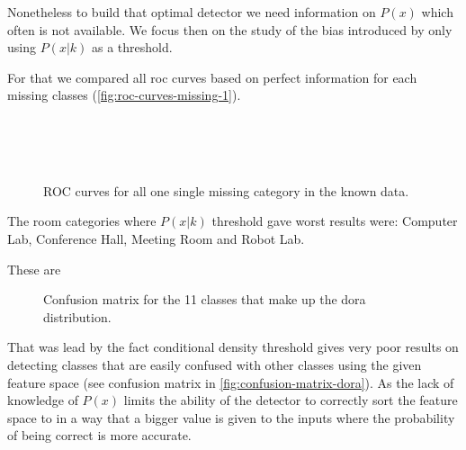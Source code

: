 \documentclass[a4paper]{article}
\begin{document}
Nonetheless to build that optimal detector we need information on $P(x)$ which often is not available.
We focus then on the study of the bias introduced by only using $P(x|k)$ as a threshold.

For that we compared all roc curves based on perfect information for each missing
classes (\autoref{fig:roc-curves-missing-1}).

\begin{figure}[h]
 \centering
  \\
  \\
  \\

\caption{\label{fig:roc-curves-missing-1}ROC curves for all one single missing category in the known data.}
\end{figure}

The room categories where $P(x|k)$ threshold gave worst results were:
Computer Lab, Conference Hall, Meeting Room and Robot Lab.

These are 
\begin{figure}
\missingfigure[figwidth=\textwidth]{}
\caption{\label{fig:confusion-matrix-dora}Confusion matrix for the 11 classes that make up the dora distribution.}
\end{figure}

That was lead by the fact conditional density threshold gives very poor results on detecting classes
that are easily confused with other classes using the given feature space (see confusion matrix in
\autoref{fig:confusion-matrix-dora}).
As the lack of knowledge of $P(x)$ limits the ability of the detector to correctly sort the feature
space to in a way that a bigger value is given to the inputs where the probability of being correct is more accurate.
\end{document}
